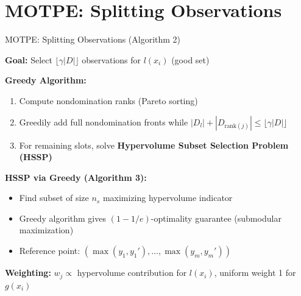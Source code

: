 \documentclass[aspectratio=169, 12pt]{beamer}
\begin{document}
\section{MOTPE: Splitting Observations}
\begin{frame}{MOTPE: Splitting Observations (Algorithm 2)}

\textbf{Goal:} Select \(\lfloor \gamma |D| \rfloor\) observations for \(l(x_i)\) (good set)

\vspace{0.2cm}

\textbf{Greedy Algorithm:}
\begin{enumerate}
    \item Compute nondomination ranks (Pareto sorting)
    \item Greedily add full nondomination fronts while \(|D_l| + |D_{\text{rank}(j)}| \leq \lfloor \gamma |D| \rfloor\)
    \item For remaining slots, solve \textbf{Hypervolume Subset Selection Problem (HSSP)}
\end{enumerate}

\vspace{0.3cm}

\textbf{HSSP via Greedy (Algorithm 3):}
\begin{itemize}
    \item Find subset of size \(n_s\) maximizing hypervolume indicator
    \item Greedy algorithm gives \((1 - 1/e)\)-optimality guarantee (submodular maximization)
    \item Reference point: \((\max(y_1, y_1'), \ldots, \max (y_m, y_m'))\)
\end{itemize}

\vspace{0.3cm}

\textbf{Weighting:} \(w_j \propto\) hypervolume contribution for \(l(x_i)\), uniform weight 1 for \(g(x_i)\)
\end{frame}
\end{document}
